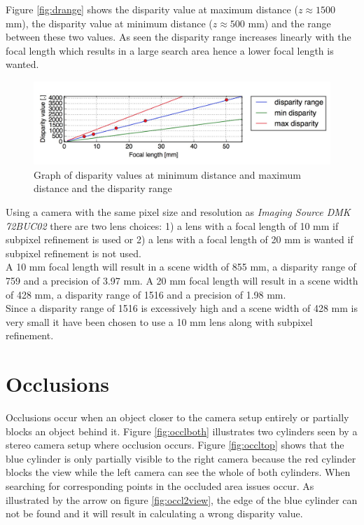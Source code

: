 Figure \vref{fig:drange} shows the disparity value at maximum distance ($z\approx 1500$ mm), the disparity value at minimum distance ($z \approx 500$ mm) and the range between these two values. As seen the disparity range increases linearly with the focal length which results in a large search area hence a lower focal length is wanted.\\
\begin{figure}[ht!]
  \centering
  \includegraphics[width=1\textwidth]{figures/drange}
  \caption{Graph of disparity values at minimum distance and maximum distance and the disparity range}
  \label{fig:drange}
\end{figure}
Using a camera with the same pixel size and resolution as \textit{Imaging Source DMK 72BUC02} there are two lens choices: 1) a lens with a focal length of 10 mm if subpixel refinement is used or 2) a lens with a focal length of 20 mm is wanted if subpixel refinement is not used. \\
A 10 mm focal length will result in a scene width of 855 mm, a disparity range of 759 and a precision of 3.97 mm. A 20 mm focal length will result in a scene width of 428 mm, a disparity range of 1516 and a precision of 1.98 mm.\\
Since a disparity range of 1516 is excessively high and a scene width of 428 mm is very small it have been chosen to use a 10 mm lens along with subpixel refinement.\\

\section{Occlusions}
Occlusions occur when an object closer to the camera setup entirely or partially blocks an object behind it. Figure \vref{fig:occlboth} illustrates two cylinders seen by a stereo camera setup where occlusion occurs. Figure \vref{fig:occltop} shows that the blue cylinder is only partially visible to the right camera because the red cylinder blocks the view while the left camera can see the whole of both cylinders. When searching for corresponding points in the occluded area issues occur. As illustrated by the arrow on figure \vref{fig:occl2view}, the edge of the blue cylinder can not be found and it will result in calculating a wrong disparity value. \\


